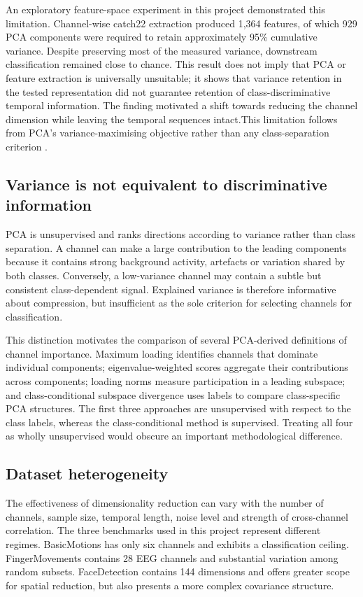 An exploratory feature-space experiment in this project demonstrated this limitation. Channel-wise catch22 extraction produced 1,364 features, of which 929 PCA components were required to retain approximately 95\% cumulative variance. Despite preserving most of the measured variance, downstream classification remained close to chance. This result does not imply that PCA or feature extraction is universally unsuitable; it shows that variance retention in the tested representation did not guarantee retention of class-discriminative temporal information. The finding motivated a shift towards reducing the channel dimension while leaving the temporal sequences intact.This limitation follows from PCA's variance-maximising objective rather
than any class-separation criterion
\citep{pearson1901pca,hotelling1933pca,jackson1991pca}.

\subsection{Variance is not equivalent to discriminative information}

PCA is unsupervised and ranks directions according to variance rather than class separation. A channel can make a large contribution to the leading components because it contains strong background activity, artefacts or variation shared by both classes. Conversely, a low-variance channel may contain a subtle but consistent class-dependent signal. Explained variance is therefore informative about compression, but insufficient as the sole criterion for selecting channels for classification.

This distinction motivates the comparison of several PCA-derived definitions of channel importance. Maximum loading identifies channels that dominate individual components; eigenvalue-weighted scores aggregate their contributions across components; loading norms measure participation in a leading subspace; and class-conditional subspace divergence uses labels to compare class-specific PCA structures. The first three approaches are unsupervised with respect to the class labels, whereas the class-conditional method is supervised. Treating all four as wholly unsupervised would obscure an important methodological difference.

\subsection{Dataset heterogeneity}

The effectiveness of dimensionality reduction can vary with the number of channels, sample size, temporal length, noise level and strength of cross-channel correlation. The three benchmarks used in this project represent different regimes. BasicMotions has only six channels and exhibits a classification ceiling. FingerMovements contains 28 EEG channels and substantial variation among random subsets. FaceDetection contains 144 dimensions and offers greater scope for spatial reduction, but also presents a more complex covariance structure.

